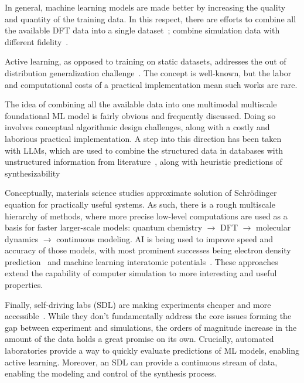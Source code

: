 \documentclass{iopjournal}
\begin{document}
In general, machine learning models are made better by increasing the quality and quantity of the training data. In this respect, there are efforts to combine all the available DFT data into a single dataset~\cite{siron2025lemat}; combine simulation data with different fidelity~\cite{cui2025multi}.

Active learning, as opposed to training on static datasets, addresses the out of distribution generalization challenge~\cite{nguyen2023hierarchical, merchant2023scaling, han2025invdesflowal, soleymanibrojeni2024active}. The concept is well-known, but the labor and computational costs of a practical implementation mean such works are rare.

The idea of combining all the available data into one multimodal multiscale foundational ML model is fairly obvious and frequently discussed. Doing so involves conceptual algorithmic design challenges, along with a costly and laborious practical implementation. A step into this direction has been taken with LLMs, which are used to combine the structured data in databases with unstructured information from literature~\cite{sriram2024flowllm}, along with heuristic predictions of synthesizability~\cite{song2025accurate}

Conceptually, materials science studies approximate solution of Schrödinger equation for practically useful systems. As such, there is a rough multiscale hierarchy of methods, where more precise low-level computations are used as a basis for faster larger-scale models: quantum chemistry $\rightarrow$ DFT $\rightarrow$ molecular dynamics $\rightarrow$ continuous modeling. AI is being used to improve speed and accuracy of those models, with most prominent successes being electron density prediction~\cite{grisafi2018transferable} and machine learning interatomic potentials~\cite{jacobs2025practical}. These approaches extend the capability of computer simulation to more interesting and useful properties.

Finally, self-driving labs (SDL) are making experiments cheaper and more accessible~\cite{correa2018accelerating}. While they don't fundamentally address the core issues forming the gap between experiment and simulations, the orders of magnitude increase in the amount of the data holds a great promise on its own. Crucially, automated laboratories provide a way to quickly evaluate predictions of ML models, enabling active learning. Moreover, an SDL can provide a continuous stream of data, enabling the modeling and control of the synthesis process.
\end{document}
